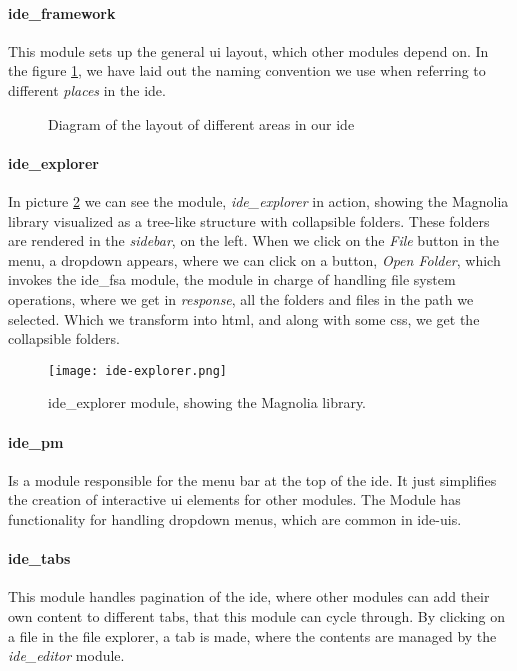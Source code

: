 \paragraph{ide\_framework} This module sets up the general \gls*{ui} layout,
which other modules depend on. In the figure \ref{fig:ideLayout}, we have laid
out the naming convention we use when referring to different \textit{places} in
the \gls*{ide}.

\begin{figure}[H]
  \centering
  
  \caption{
    Diagram of the layout of different areas in our \gls*{ide}
  }
  \label{fig:ideLayout}
\end{figure}

\paragraph{ide\_explorer} In picture \ref{pic:ideEx} we can see the
module, \textit{ide\_explorer} in action, showing the Magnolia library
visualized as a tree-like structure with collapsible folders. These folders are
rendered in the \textit{sidebar}, on the left. When we click on the
\textit{File} button in the menu, a dropdown appears, where we can click on a
button, \textit{Open Folder}, which invokes the ide\_fsa module, the module in
charge of handling file system operations, where we get in \textit{response},
all the folders and files in the path we selected. Which we transform into
\gls*{html}, and along with some \gls*{css}, we get the collapsible folders.

\begin{figure}[H]
  \centering
  \texttt{[image: ide-explorer.png]}
  \caption{
    ide\_explorer module, showing the Magnolia library.
  }
  \label{pic:ideEx}
\end{figure}


\paragraph{ide\_pm} Is a module responsible for the menu bar at the top of the
\gls*{ide}. It just simplifies the creation of interactive \gls*{ui} elements
for other modules. The Module has functionality for handling dropdown menus,
which are common in \gls*{ide}-\gls*{ui}s.

\paragraph{ide\_tabs} This module handles pagination of the \gls*{ide}, where
other modules can add their own content to different tabs, that this module can
cycle through. By clicking on a file in the file explorer, a tab is made, where
the contents are managed by the \textit{ide\_editor} module.

